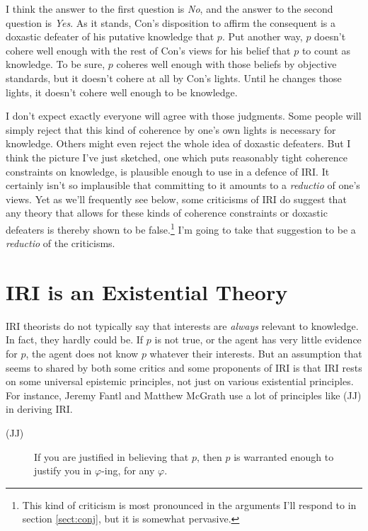 \documentclass[oneside, a4paper]{book}
\begin{document}
\noindent I think the answer to the first question is \textit{No}, and the answer to the second question is \textit{Yes}. As it stands, Con's disposition to affirm the consequent is a doxastic defeater of his putative knowledge that $p$. Put another way, $p$ doesn't cohere well enough with the rest of Con's views for his belief that $p$ to count as knowledge. To be sure, $p$ coheres well enough with those beliefs by objective standards, but it doesn't cohere at all by Con's lights. Until he changes those lights, it doesn't cohere well enough to be knowledge.

I don't expect exactly everyone will agree with those judgments. Some people will simply reject that this kind of coherence by one's own lights is necessary for knowledge. Others might even reject the whole idea of doxastic defeaters. But I think the picture I've just sketched, one which puts reasonably tight coherence constraints on knowledge, is plausible enough to use in a defence of IRI. It certainly isn't so implausible that committing to it amounts to a \textit{reductio} of one's views. Yet as we'll frequently see below, some criticisms of IRI do suggest that any theory that allows for these kinds of coherence constraints or doxastic defeaters is thereby shown to be false.\footnote{This kind of criticism is most pronounced in the arguments I'll respond to in section \ref{sect:conj}, but it is somewhat pervasive.} I'm going to take that suggestion to be a \textit{reductio} of the criticisms.

\section{IRI is an Existential Theory} \label{sect:existential}

IRI theorists do not typically say that interests are \textit{always} relevant to knowledge. In fact, they hardly could be. If $p$ is not true, or the agent has very little evidence for $p$, the agent does not know $p$ whatever their interests. But an assumption that seems to shared by both some critics and some proponents of IRI is that IRI rests on some universal epistemic principles, not just on various existential principles. For instance, Jeremy Fantl and Matthew McGrath use a lot of principles like (JJ) in deriving IRI.

\begin{description}
\item[(JJ)] If you are justified in believing that \(p\), then \(p\) is warranted enough to justify you in \(\varphi\)-ing, for any \(\varphi\). \cite[99]{FantlMcGrath2009}
\end{description}
\end{document}
